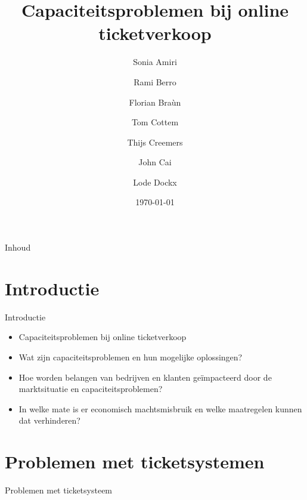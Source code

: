 \documentclass{beamer}
\title{Capaciteitsproblemen bij online ticketverkoop}
\author{Sonia Amiri \and Rami Berro \and Florian Braùn \and Tom Cottem \and Thijs Creemers \and John Cai \and Lode Dockx}
\date{\today}
\begin{document}
\begin{frame}
  \titlepage
\end{frame}

\begin{frame}{Inhoud}
  \tableofcontents
\end{frame}

\section[Intro]{Introductie}
\begin{frame}{Introductie}
    \begin{itemize}
        \item Capaciteitsproblemen bij online ticketverkoop
        \item Wat zijn capaciteitsproblemen en hun mogelijke oplossingen?
        \item Hoe worden belangen van bedrijven en klanten geïmpacteerd door de marktsituatie en capaciteitsproblemen?
        \item In welke mate is er economisch machtsmisbruik en welke maatregelen kunnen dat verhinderen?
    \end{itemize}
\end{frame}

\section[Ticketsystemen]{Problemen met ticketsystemen}
\begin{frame}{Problemen met ticketsysteem}
    
\end{frame}
\end{document}
